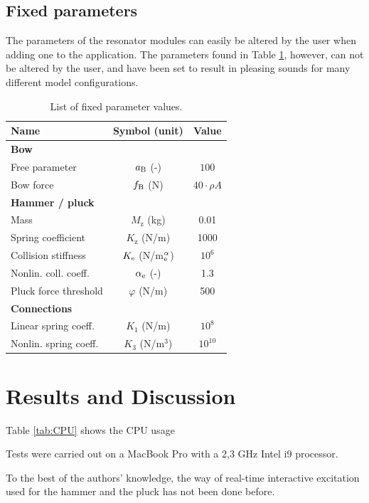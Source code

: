 \documentclass{article}
\begin{document}
\subsection{Fixed parameters}
The parameters of the resonator modules can easily be altered by the user when adding one to the application. The parameters found in Table \ref{tab:parameters}, however, can not be altered by the user, and have been set to result in pleasing sounds for many different model configurations.
\begin{table}[h]\label{tab:parameters}
\begin{center}
\begin{tabular}{|l|c|c|}
    \hline
    Name & Symbol (unit) & Value\\ \hline
    \multicolumn{3}{|l|}{\bf Bow}\\ \hline
    Free parameter & $a_{\text{B}}$ (-) & $100$\\
    Bow force & $f_{\text{B}}$ (N) & $40 \cdot \rho A$\\\hline
    \multicolumn{3}{|l|}{\bf Hammer / pluck}\\ \hline
    Mass & $M_\text{z}$ (kg) & 0.01\\
    Spring coefficient & $K_\text{z}$ (N/m) & 1000\\
    Collision stiffness& $K_{\text{e}}$ (N/m$^\alpha_{\text{e}}$) & $10^6$\\
    Nonlin. coll. coeff. & $\alpha_{\text{e}}$ (-) & 1.3\\
    Pluck force threshold & $\varphi$ (N/m) & 500\\\hline
    \multicolumn{3}{|l|}{\bf Connections}\\ \hline
    Linear spring coeff. & $K_1$ (N/m)  & $10^8$ \\
    Nonlin. spring coeff. & $K_3$ (N/m$^3$)  & $10^{10}$
    \\\hline
\end{tabular}
\caption{List of fixed parameter values.}
\end{center}
\end{table}

\section{Results and Discussion}\label{sec:resDiscuss}
Table \ref{tab:CPU} shows the CPU usage

Tests were carried out on a MacBook Pro with a 2,3 GHz Intel i9 processor.

To the best of the authors' knowledge, the way of real-time interactive excitation used for the hammer and the pluck has not been done before. 
\end{document}
